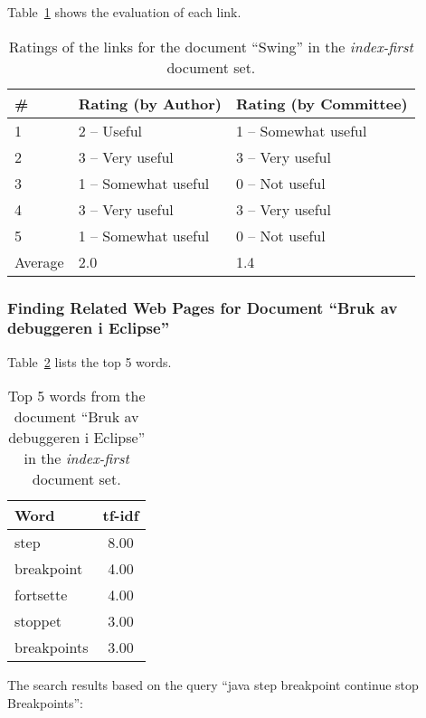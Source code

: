 Table~\ref{tab:ratings-no-swing-2} shows the evaluation of each link.
\begin{table}[H]
\centering
\begin{tabular}{|l|l|l|}
\hline\hline
    \# & Rating (by Author) & Rating (by Committee) \\
\hline
    1 & 2 -- Useful & 1 -- Somewhat useful \\
    2 & 3 -- Very useful & 3 -- Very useful \\
    3 & 1 -- Somewhat useful & 0 -- Not useful \\
    4 & 3 -- Very useful & 3 -- Very useful \\
    5 & 1 -- Somewhat useful & 0 -- Not useful \\
\hline
    Average & 2.0 & 1.4 \\
\hline\hline
\end{tabular}
\caption{Ratings of the links for the document ``Swing'' in the \textit{index-first} document set.}
\label{tab:ratings-no-swing-2}
\end{table}


\subsubsection{Finding Related Web Pages for Document ``Bruk av debuggeren i Eclipse''}
\label{subsubsec:no-bruk-av-debuggeren-i-eclipse-2}

Table~\ref{tab:topWords-no-bruk-av-debuggeren-i-eclipse-2} lists the top 5 words.
\begin{table}[H]
\centering
\begin{tabular}{|l|c|}
\hline\hline
    Word & tf-idf \\
\hline
    step & 8.00 \\
    breakpoint & 4.00 \\
    fortsette & 4.00 \\
    stoppet & 3.00 \\
    breakpoints & 3.00 \\
\hline\hline
\end{tabular}
\caption{Top 5 words from the document ``Bruk av debuggeren i Eclipse'' in the \textit{index-first} document set.}
\label{tab:topWords-no-bruk-av-debuggeren-i-eclipse-2}
\end{table}

The search results based on the query ``java step breakpoint continue stop Breakpoints'':

